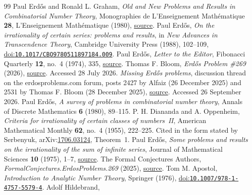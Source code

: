 \documentclass[11pt]{article}
\theoremstyle{remark}
\theoremstyle{plain}
\begin{document}
\begin{thebibliography}{99}
 Paul Erd\H{o}s and Ronald L. Graham,
  \emph{Old and New Problems and Results in Combinatorial Number Theory}, Monographies de L'Enseignement Math\'{e}matique \textbf{28}, L'Enseignement Math\'{e}matique (1980),
  \href{https://mathweb.ucsd.edu/~ronspubs/80_11_number_theory.pdf}{source}.
 Paul Erd\H{o}s,
  \emph{On the irrationality of certain series: problems and results}, in \emph{New Advances in Transcendence Theory}, Cambridge University Press (1988), 102--109,
  \href{https://doi.org/10.1017/CBO9780511897184.009}{doi:\nolinkurl{10.1017/CBO9780511897184.009}}.
 Paul Erd\H{o}s,
  \emph{Letter to the Editor}, Fibonacci Quarterly \textbf{12}, no.~4 (1974), 335,
  \href{https://www.fq.math.ca/Scanned/12-4/letter.pdf}{source}.
 Thomas F. Bloom,
  \emph{Erd\H{o}s Problem \#269} (2026),
  \href{https://www.erdosproblems.com/269}{source}. Accessed 28 July 2026.
 \emph{Missing Erd\H{o}s problems},
  discussion thread on the erdosproblems.com forum, posts 2427 by Alfaiz
  (26 December 2025) and 2531 by Thomas F. Bloom (28 December 2025),
  \href{https://www.erdosproblems.com/forum/thread/Missing\%20Erd\%C5\%91s\%20problems}{source}.
  Accessed 26 September 2026.
 Paul Erd\H{o}s,
  \emph{A survey of problems in combinatorial number theory},
  Annals of Discrete Mathematics \textbf{6} (1980), 89--115.
 P. H. Diananda and A. Oppenheim,
  \emph{Criteria for irrationality of certain classes of numbers~II},
  American Mathematical Monthly \textbf{62}, no.~4 (1955), 222--225.
  Cited in the form stated by Serbenyuk, arXiv:\href{https://arxiv.org/abs/1706.03124}{1706.03124}, Theorem~1.
 Paul Erd\H{o}s,
  \emph{Some problems and results on the irrationality of the sum of infinite series},
  Journal of Mathematical Sciences \textbf{10} (1975), 1--7,
  \href{https://users.renyi.hu/~p_erdos/1976-44.pdf}{source}.
 The Formal Conjectures Authors,
  \emph{FormalConjectures.ErdosProblems.269} (2025),
  \href{https://github.com/google-deepmind/formal-conjectures/blob/f776d2f2039351b00737ffcafb9d7d7666e1d9af/FormalConjectures/ErdosProblems/269.lean}{source}.
 Tom M. Apostol,
  \emph{Introduction to Analytic Number Theory}, Springer (1976),
  \href{https://doi.org/10.1007/978-1-4757-5579-4}{doi:\nolinkurl{10.1007/978-1-4757-5579-4}}.
 Adolf Hildebrand,

\end{thebibliography}
\end{document}
